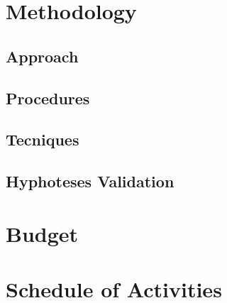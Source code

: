 \section{Methodology} \label{sec:Methodology}

\subsection{Approach}

\subsection{Procedures}

\subsection{Tecniques}

\subsection{Hyphoteses Validation}


\section{Budget} \label{sec:budget}


\section{Schedule of Activities} \label{sec:schedule_activities_table}

